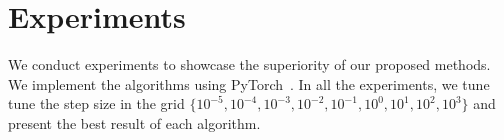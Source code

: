 \documentclass[twoside,11pt]{article}
\begin{document}

 
\section{Experiments}

We conduct experiments to showcase the superiority of our proposed methods. We implement the algorithms using PyTorch~\citep{paszke2019pytorch}. In all the experiments, we tune 
tune the step size in the grid $\{10^{-5}, 10^{-4},10^{-3},10^{-2},10^{-1},10^0, 10^1, 10^2,10^3 \}$ and present the best result of each algorithm.









\end{document}
